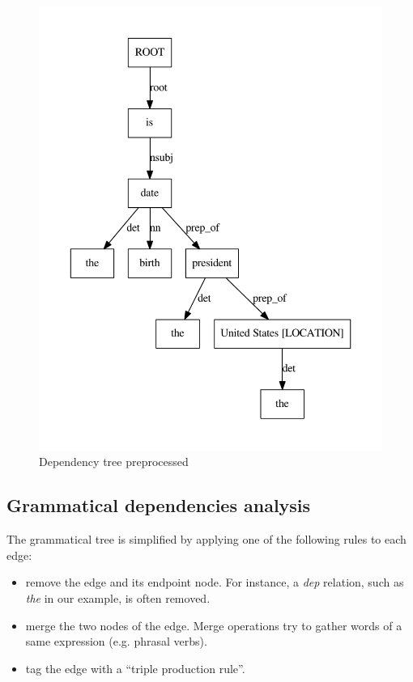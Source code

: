 \begin{figure}
  \centering
  \label{tree_two}
    \includegraphics[scale=0.6]{../examples_NLP_classical/tree2.pdf}
  \caption{Dependency tree preprocessed}
\end{figure}


\subsection{Grammatical dependencies analysis}

The grammatical tree is simplified by applying one of the following rules to each edge:
\begin{itemize}
 \item remove the edge and its endpoint node. For instance, a \textit{dep} relation, such as \textit{the} in our example, is often removed.
 \item merge the two nodes of the edge. Merge operations try to gather words of a same expression (e.g. phrasal verbs).
 \item tag the edge with a ``triple production rule''.
\end{itemize}

